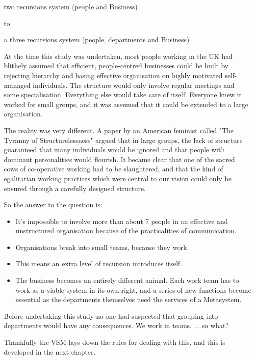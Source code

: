 two recursions system (people and Business)

to

a three recursions system (people, departments and Business)

At the time this study was undertaken, most people working in the UK had blithely assumed that efficient, people-centred businesses could be built by rejecting hierarchy and basing effective organisation on highly motivated self-managed individuals. The structure would only involve regular meetings and some specialisation. Everything else would take care of itself. Everyone knew it worked for small groups, and it was assumed that it could be extended to a large organisation.

The reality was very different. A paper by an American feminist called "The Tyranny of Structurelessness" argued that in large groups, the lack of structure guaranteed that many individuals would be ignored and that people with dominant personalities would flourish. It became clear that one of the sacred cows of co-operative working had to be slaughtered, and that the kind of egalitarian working practices which were central to our vision could only be ensured through a carefully designed structure.

So the answer to the question is:

\begin{itemize}
  \item It's impossible to involve more than about 7 people in an effective and unstructured organisation because of the practicalities of communication.

  \item Organisations break into small teams, because they work.

  \item This means an extra level of recursion introduces itself.

  \item The business becomes an entirely different animal. Each work team has to work as a viable system in its own right, and a series of new functions become essential as the departments themselves need the services of a Metasystem.

\end{itemize}

Before undertaking this study no-one had suspected that grouping into departments would have any consequences. We work in teams. ... so what?

Thankfully the VSM lays down the rules for dealing with this, and this is developed in the next chapter.
